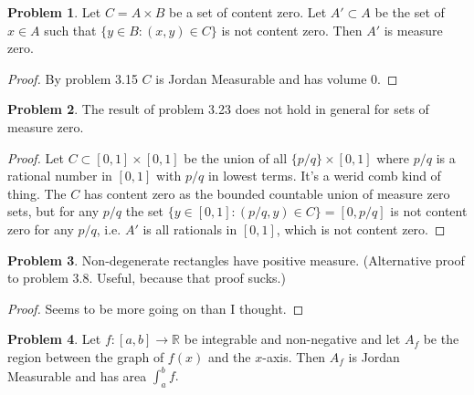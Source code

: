 \documentclass[20pt]{article}
\theoremstyle{plain}
\theoremstyle{definition}
\newtheorem*{problem}{Problem}
\newcommand{\reals}{\mathbb{R}}
\begin{document}
\begin{problem}{3.23}
  Let $C = A \times B$ be a set of content zero.
  Let $A' \subset A$ be the set of $x \in A$ such that 
  $\{ y \in B: (x, y) \in C \}$ is not content zero.
  Then $A'$ is measure zero.
\end{problem}
\begin{proof}
  By problem 3.15 $C$ is Jordan Measurable and has volume $0$.
\end{proof}



\begin{problem}{3.24}
  The result of problem 3.23 does not hold in general for sets of measure zero.
\end{problem}

\begin{proof}
  Let $C\subset [0,1] \times [0,1]$ be the union of all 
  $\{ p/q \} \times [0, 1]$ where $p/q$ is a rational number in $[0, 1]$ with 
  $p/q$ in lowest terms. It's a werid comb kind of thing.
  The $C$ has content zero as the bounded countable union of measure zero sets, but 
  for any $p/q$ the set $\{ y \in [0, 1]: (p/q, y) \in C \} = [0, p/q]$
  is not content zero for any $p/q$, i.e. $A'$ is all rationals in $[0,1]$, which 
  is not content zero.
\end{proof}



\begin{problem}{3.25}
  Non-degenerate rectangles have positive measure.
  (Alternative proof to problem 3.8.  Useful, because that proof sucks.)
\end{problem}

\begin{proof}
  \color{ForestGreen}
  Seems to be more going on than I thought.
\end{proof}
  


\begin{problem}{3.26}
  Let $f: [a, b] \to \reals$ be integrable and non-negative and let 
  $A_f$ be the region between the graph of $f(x)$ and the $x$-axis.
  Then $A_f$ is Jordan Measurable and has area $\int_a^b f.$
\end{problem}
\end{document}
